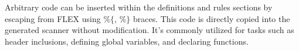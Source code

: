 Arbitrary code can be inserted within the definitions and rules sections by escaping from FLEX using $\%\{$, $\%\}$ braces. 
This code is directly copied into the generated scanner without modification.
It's commonly utilized for tasks such as header inclusions, defining global variables, and declaring functions.